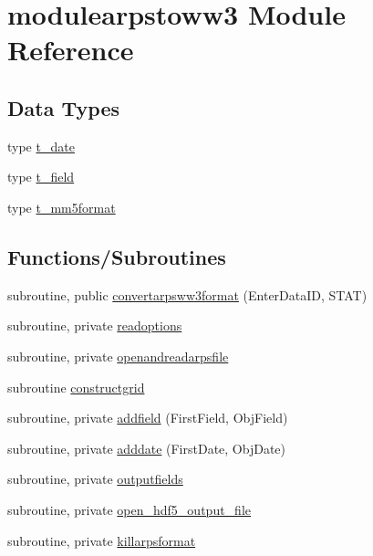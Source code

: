 \hypertarget{namespacemodulearpstoww3}{}\section{modulearpstoww3 Module Reference}
\label{namespacemodulearpstoww3}
\subsection*{Data Types}
\begin{DoxyCompactItemize}
\item 
type \mbox{\hyperlink{structmodulearpstoww3_1_1t__date}{t\+\_\+date}}
\item 
type \mbox{\hyperlink{structmodulearpstoww3_1_1t__field}{t\+\_\+field}}
\item 
type \mbox{\hyperlink{structmodulearpstoww3_1_1t__mm5format}{t\+\_\+mm5format}}
\end{DoxyCompactItemize}
\subsection*{Functions/\+Subroutines}
\begin{DoxyCompactItemize}
\item 
subroutine, public \mbox{\hyperlink{namespacemodulearpstoww3_a42304b111881f48406d8d939918e21ef}{convertarpsww3format}} (Enter\+Data\+ID, S\+T\+AT)
\item 
subroutine, private \mbox{\hyperlink{namespacemodulearpstoww3_a7642538ceff4533a4ad2aeba84fb2d32}{readoptions}}
\item 
subroutine, private \mbox{\hyperlink{namespacemodulearpstoww3_aa5a12099f3353b33d3b40f8f3f4384f0}{openandreadarpsfile}}
\item 
subroutine \mbox{\hyperlink{namespacemodulearpstoww3_a509b1aea6540dc5784cfe7424f0e6414}{constructgrid}}
\item 
subroutine, private \mbox{\hyperlink{namespacemodulearpstoww3_a0277d24244051759af2fcc3106ef5a08}{addfield}} (First\+Field, Obj\+Field)
\item 
subroutine, private \mbox{\hyperlink{namespacemodulearpstoww3_a81436aea40d31bddb32f553e227a991d}{adddate}} (First\+Date, Obj\+Date)
\item 
subroutine, private \mbox{\hyperlink{namespacemodulearpstoww3_a7c18511d187912f655458191bcf1c7af}{outputfields}}
\item 
subroutine, private \mbox{\hyperlink{namespacemodulearpstoww3_a7a7eb9b823582e046e2127ea46d3f300}{open\+\_\+hdf5\+\_\+output\+\_\+file}}
\item 
subroutine, private \mbox{\hyperlink{namespacemodulearpstoww3_a2b22a4f72b20cf6f219d61b511afcad1}{killarpsformat}}
\end{DoxyCompactItemize}

